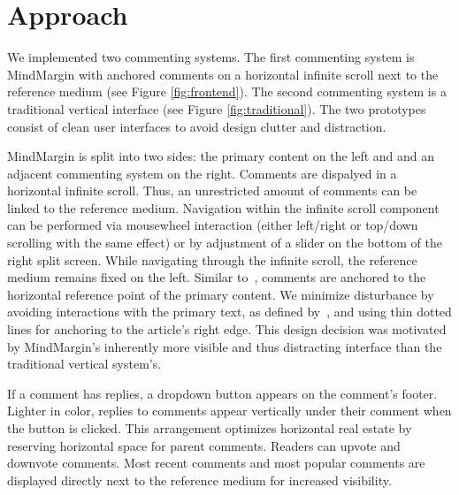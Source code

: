 \section {Approach}

We implemented two commenting systems. The first commenting system is MindMargin with anchored comments on a horizontal infinite scroll next to the reference medium (see Figure \ref{fig:frontend}). The second commenting system is a traditional vertical interface (see Figure \ref{fig:traditional}). The two prototypes consist of clean user interfaces to avoid design clutter and distraction. 

MindMargin is split into two sides: the primary content on the left and and an adjacent commenting system on the right. Comments are dispalyed in a horizontal infinite scroll. Thus, an unrestricted amount of comments can be linked to the reference medium. Navigation within the infinite scroll component can be performed via mousewheel interaction (either left/right or top/down scrolling with the same effect) or by adjustment of a slider on the bottom of the right split screen. While navigating through the infinite scroll, the reference medium remains fixed on the left. Similar to~\cite{FluidDocs, NB}, comments are anchored to the horizontal reference point of the primary content. We minimize disturbance by avoiding interactions with the primary text, as defined by~\cite{FluidDocs}, and using thin dotted lines for anchoring to the article's right edge. This design decision was motivated by MindMargin's inherently more visible and thus distracting interface than the traditional vertical system's. 

If a comment has replies, a dropdown button appears on the comment's footer. Lighter in color, replies to comments appear vertically under their comment when the button is clicked. This arrangement optimizes horizontal real estate by reserving horizontal space for parent comments. Readers can upvote and downvote comments. Most recent comments and most popular comments are displayed directly next to the reference medium for increased visibility.


